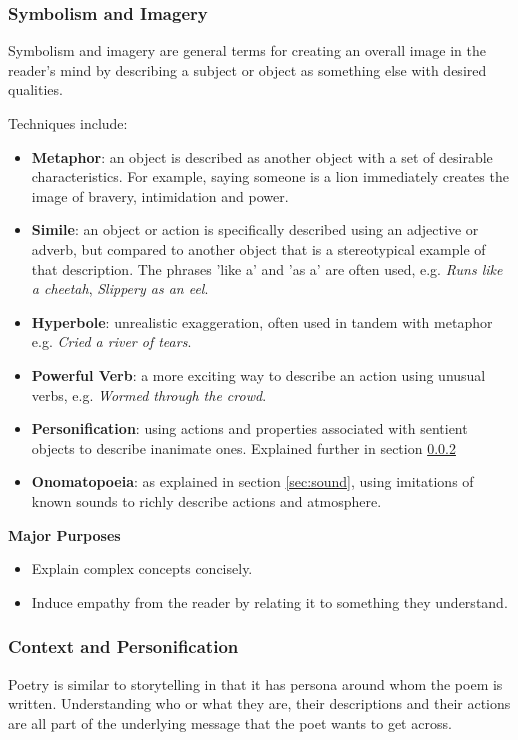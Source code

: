 \subsubsection{Symbolism and Imagery}
\label{sec:symbol}
Symbolism and imagery are general terms for creating an overall image in the reader's mind by describing a subject or object as something else with desired qualities.

Techniques include:
\begin{itemize}
\item{\textbf{Metaphor}: an object is described as another object with a set of desirable characteristics. For example, saying someone is a lion immediately creates the image of bravery, intimidation and power.}
\item{\textbf{Simile}: an object or action is specifically described using an adjective or adverb, but compared to another object that is a stereotypical example of that description. The phrases 'like a' and 'as a' are often used, e.g. \textit{Runs like a cheetah}, \textit{Slippery as an eel}.}
\item{\textbf{Hyperbole}: unrealistic exaggeration, often used in tandem with metaphor e.g. \textit{Cried a river of tears}.}
\item{\textbf{Powerful Verb}: a more exciting way to describe an action using unusual verbs, e.g. \textit{Wormed through the crowd}.}
\item{\textbf{Personification}: using actions and properties associated with sentient objects to describe inanimate ones. Explained further in section \ref{sec:pragpers}}
\item{\textbf{Onomatopoeia}: as explained in section \ref{sec:sound}}, using imitations of known sounds to richly describe actions and atmosphere.
\end{itemize}

\textbf{Major Purposes}
\begin{itemize}
\item{Explain complex concepts concisely.}
\item{Induce empathy from the reader by relating it to something they understand.}
\end{itemize} 

\subsubsection{Context and Personification}
\label{sec:pragpers}
Poetry is similar to storytelling in that it has persona around whom the poem is written. Understanding who or what they are, their descriptions and their actions are all part of the underlying message that the poet wants to get across.

